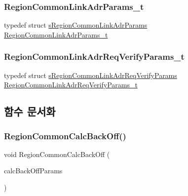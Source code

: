 \subsubsection{\texorpdfstring{Region\+Common\+Link\+Adr\+Params\+\_\+t}{RegionCommonLinkAdrParams\_t}}
{\footnotesize\ttfamily typedef struct \mbox{\hyperlink{structs_region_common_link_adr_params}{s\+Region\+Common\+Link\+Adr\+Params}} \mbox{\hyperlink{group___r_e_g_i_o_n_c_o_m_m_o_n_ga6e1aaa6b8d179e2daffac8d1e23d7f24}{Region\+Common\+Link\+Adr\+Params\+\_\+t}}}

\mbox{\label{group___r_e_g_i_o_n_c_o_m_m_o_n_gad186afbaf1b52893ddc3fa5eba88de0a}} 
\subsubsection{\texorpdfstring{Region\+Common\+Link\+Adr\+Req\+Verify\+Params\+\_\+t}{RegionCommonLinkAdrReqVerifyParams\_t}}
{\footnotesize\ttfamily typedef struct \mbox{\hyperlink{structs_region_common_link_adr_req_verify_params}{s\+Region\+Common\+Link\+Adr\+Req\+Verify\+Params}} \mbox{\hyperlink{group___r_e_g_i_o_n_c_o_m_m_o_n_gad186afbaf1b52893ddc3fa5eba88de0a}{Region\+Common\+Link\+Adr\+Req\+Verify\+Params\+\_\+t}}}



\subsection{함수 문서화}
\mbox{\label{group___r_e_g_i_o_n_c_o_m_m_o_n_gae2b1dfba27c79f605048f2d9869dc57d}} 
\subsubsection{\texorpdfstring{Region\+Common\+Calc\+Back\+Off()}{RegionCommonCalcBackOff()}}
{\footnotesize\ttfamily void Region\+Common\+Calc\+Back\+Off (\begin{DoxyParamCaption}\item[{\mbox{\hyperlink{group___r_e_g_i_o_n_c_o_m_m_o_n_ga26c2fc7c3e1d929d59b5653a5cd1fc0c}{Region\+Common\+Calc\+Back\+Off\+Params\+\_\+t}} $\ast$}]{calc\+Back\+Off\+Params }\end{DoxyParamCaption})}



